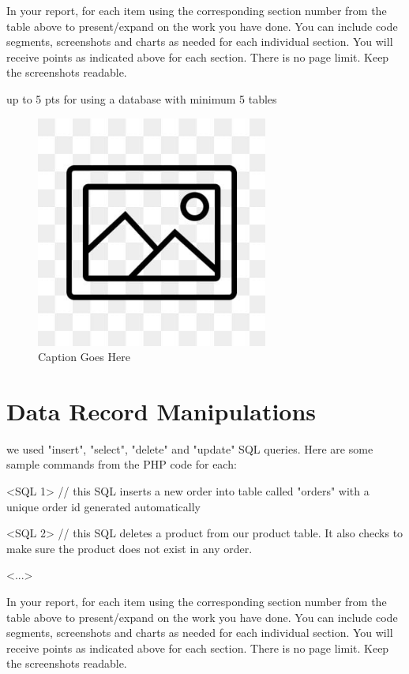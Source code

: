 \documentclass[12pt, letterpaper]{article}
\begin{document}
In your report, for each item using the corresponding section number from the table above to present/expand on the work you have done. You can include code segments, screenshots and charts as needed for each individual section. You will receive points as indicated above for each section. There is no page limit. Keep the screenshots readable.

up to 5 pts for using a database with minimum 5 tables

\begin{figure}[htbp]
	\centering
	\includegraphics[width=3in]{images/placeholder.jpg}
	\caption{Caption Goes Here}
 \end{figure}

 \newpage

\section{Data Record Manipulations}
we used "insert", "select", "delete" and "update" SQL queries. Here are some sample commands from the PHP code for each:

<SQL 1> // this SQL inserts a new order into table called "orders" with a unique order id generated automatically

<SQL 2> // this SQL deletes a product from our product table. It also checks to make sure the product does not exist in any order.

<...>

In your report, for each item using the corresponding section number from the table above to present/expand on the work you have done. You can include code segments, screenshots and charts as needed for each individual section. You will receive points as indicated above for each section. There is no page limit. Keep the screenshots readable.
\end{document}
